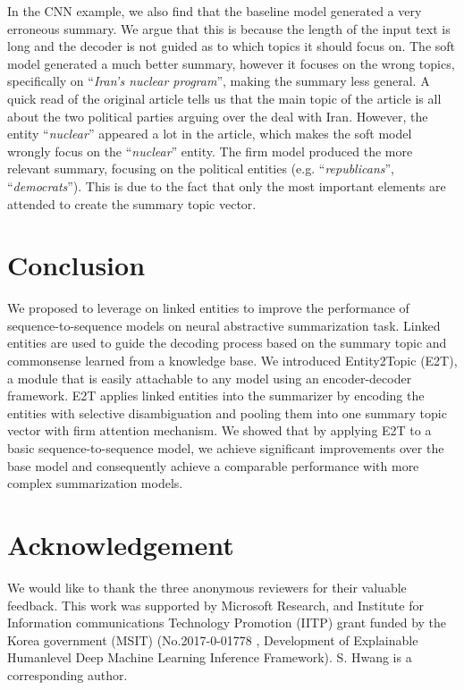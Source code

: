 \documentclass[11pt,a4paper]{article}
\begin{document}
In the CNN example, we also find that the baseline model generated a very erroneous summary. We argue that this is because the length of the input text is long and the decoder is not guided as to which topics it should focus on.
The soft model generated a much better summary, however it focuses on the wrong topics, specifically on ``\textit{Iran's nuclear program}'', making the summary less general.
A quick read of the original article tells us that the main topic of the article is all about the two political parties arguing over the deal with Iran. However, the entity ``\textit{nuclear}'' appeared a lot in the article, which makes the soft model wrongly focus on the ``\textit{nuclear}'' entity.
The firm model produced the more relevant summary, focusing on the political entities (e.g. ``\textit{republicans}'', ``\textit{democrats}''). This is due to the fact that only the  most important elements are attended to create the summary topic vector.

\section{Conclusion}

We proposed to leverage on linked entities to improve the performance of sequence-to-sequence models on neural abstractive summarization task. Linked entities are used to guide the decoding process based on the summary topic and commonsense learned from a knowledge base. We introduced Entity2Topic (E2T), a module that is easily attachable to any 
model using an encoder-decoder framework. E2T applies linked entities into the summarizer by encoding the entities with selective disambiguation and pooling them into one summary topic vector with firm attention mechanism. We showed that by applying E2T to a basic sequence-to-sequence model, we achieve significant improvements over the base model and consequently achieve a comparable performance with more complex summarization models.

\section*{Acknowledgement}
We would like to thank the three anonymous reviewers for their valuable feedback.
This work was supported by Microsoft Research, and Institute for Information communications Technology Promotion (IITP) grant funded by the Korea government (MSIT) (No.2017-0-01778 , Development of Explainable Humanlevel Deep Machine Learning Inference Framework). S. Hwang is a corresponding author.



\end{document}
